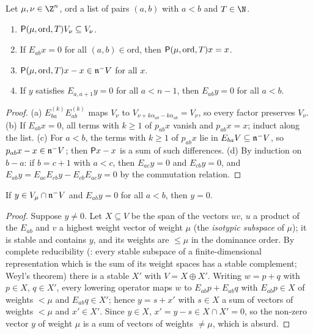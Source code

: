 \begin{lemma}\label{pf:sh-curv:elem}
Let $\mu,\nu\in\Z^n$, $\mathrm{ord}$ a list of pairs $(a,b)$ with $a<b$ and $T\in\N$.
\begin{enumerate}[label=(\alph*)]
\item $\mathsf P(\mu,\mathrm{ord},T)V_\nu\subseteq V_\nu$.
\item If $E_{ab}x=0$ for all $(a,b)\in\mathrm{ord}$, then $\mathsf P(\mu,\mathrm{ord},T)x=x$.
\item $\mathsf P(\mu,\mathrm{ord},T)x-x\in\mathfrak n^- V$ for all $x$.
\item If $y$ satisfies $E_{a,a+1}y=0$ for all $a<n-1$, then $E_{ab}y=0$ for all $a<b$.
\end{enumerate}
\end{lemma}

\begin{proof}
(a) $E^{(k)}_{ba}E^{(k)}_{ab}$ maps $V_\nu$ to $V_{\nu+k\alpha_{ab}-k\alpha_{ab}}=V_\nu$, so every factor preserves $V_\nu$.
(b) If $E_{ab}x=0$, all terms with $k\ge1$ of $p_{ab}x$ vanish and $p_{ab}x=x$; induct along the list. (c) For $a<b$, the
terms with $k\ge1$ of $p_{ab}x$ lie in $E_{ba}V\subseteq\mathfrak n^- V$, so $p_{ab}x-x\in\mathfrak n^- V$; then
$\mathsf P x-x$ is a sum of such differences. (d) By induction on $b-a$: if $b=c+1$ with $a<c$, then $E_{ac}y=0$ and
$E_{cb}y=0$, and $E_{ab}y=E_{ac}E_{cb}y-E_{cb}E_{ac}y=0$ by the commutation relation.
\end{proof}

\begin{lemma}\label{pf:sh-curv:hwvn}
If $y\in V_\mu\cap\mathfrak n^- V$ and $E_{ab}y=0$ for all $a<b$, then $y=0$.
\end{lemma}

\begin{proof}
Suppose $y\ne0$. Let $X\subseteq V$ be the span of the vectors $uv$, $u$ a product of the $E_{ab}$ and $v$ a highest weight
vector of weight $\mu$ (the \emph{isotypic subspace} of $\mu$); it is stable and contains $y$, and its weights are
$\le\mu$ in the dominance order. By complete reducibility (:
every stable subspace of a finite-dimensional representation which is the sum of its weight spaces has a stable
complement; Weyl's theorem) there is a stable $X'$ with $V=X\oplus X'$. Writing
$w=p+q$ with $p\in X$, $q\in X'$, every lowering operator maps $w$ to $E_{ab}p+E_{ab}q$ with $E_{ab}p\in X$ of weights
$<\mu$ and $E_{ab}q\in X'$; hence $y=s+x'$ with $s\in X$ a sum of vectors of weights $<\mu$ and $x'\in X'$. Since $y\in X$,
$x'=y-s\in X\cap X'=0$, so the non-zero vector $y$ of weight $\mu$ is a sum of vectors of weights $\ne\mu$, which is absurd.
\end{proof}

